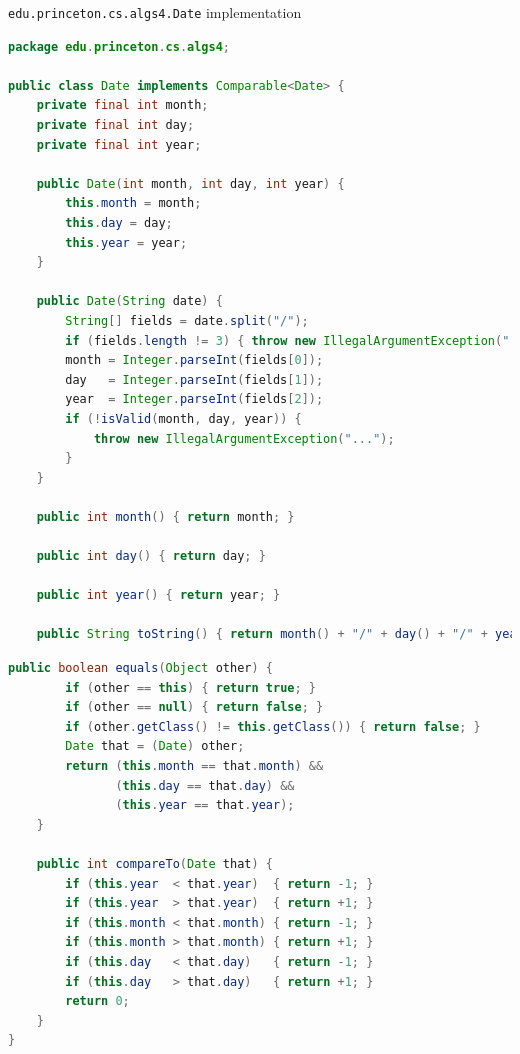\documentclass[8pt,a4paper,compress]{beamer}
\begin{document}
\begin{frame}[fragile]
\pause

\lstinline{edu.princeton.cs.algs4.Date} implementation
\begin{lstlisting}[language=Java]
package edu.princeton.cs.algs4;

public class Date implements Comparable<Date> {
    private final int month;
    private final int day;
    private final int year;
    
    public Date(int month, int day, int year) { 
        this.month = month; 
        this.day = day; 
        this.year = year; 
    }
    
    public Date(String date) {
        String[] fields = date.split("/");
        if (fields.length != 3) { throw new IllegalArgumentException("..."); }
        month = Integer.parseInt(fields[0]);
        day   = Integer.parseInt(fields[1]);
        year  = Integer.parseInt(fields[2]);
        if (!isValid(month, day, year)) {
            throw new IllegalArgumentException("...");
        }
    }
   
    public int month() { return month; }

    public int day() { return day; }

    public int year() { return year; }
    
    public String toString() { return month() + "/" + day() + "/" + year(); }
\end{lstlisting}
\end{frame}

\begin{frame}[fragile]
\pause

\begin{lstlisting}[language=Java]
    public boolean equals(Object other) {
        if (other == this) { return true; }
        if (other == null) { return false; }
        if (other.getClass() != this.getClass()) { return false; }
        Date that = (Date) other;
        return (this.month == that.month) && 
               (this.day == that.day) && 
               (this.year == that.year);
    }
    
    public int compareTo(Date that) {
        if (this.year  < that.year)  { return -1; }
        if (this.year  > that.year)  { return +1; }
        if (this.month < that.month) { return -1; }
        if (this.month > that.month) { return +1; }
        if (this.day   < that.day)   { return -1; }
        if (this.day   > that.day)   { return +1; }
        return 0;
    }
}
\end{lstlisting}
\end{frame}
\end{document}
